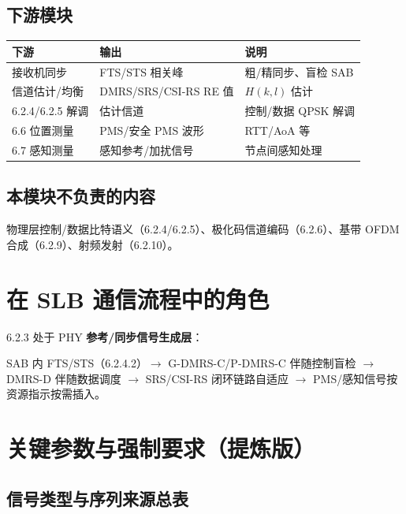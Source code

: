 \documentclass[11pt,a4paper]{ctexart}
\begin{document}
\subsection{下游模块}

\begin{table}[h]
\centering
\small
\begin{tabular}{L{4cm}L{4.5cm}L{5.5cm}}
\toprule
\textbf{下游} & \textbf{输出} & \textbf{说明} \\
\midrule
接收机同步 & FTS/STS 相关峰 & 粗/精同步、盲检 SAB \\
信道估计/均衡 & DMRS/SRS/CSI-RS RE 值 & $H(k,l)$ 估计 \\
6.2.4/6.2.5 解调 & 估计信道 & 控制/数据 QPSK 解调 \\
6.6 位置测量 & PMS/安全 PMS 波形 & RTT/AoA 等 \\
6.7 感知测量 & 感知参考/加扰信号 & 节点间感知处理 \\
\bottomrule
\end{tabular}
\end{table}

\subsection{本模块不负责的内容}

物理层控制/数据比特语义（6.2.4/6.2.5）、极化码信道编码（6.2.6）、基带 OFDM 合成（6.2.9）、射频发射（6.2.10）。

\section{在 SLB 通信流程中的角色}

6.2.3 处于 PHY \textbf{参考/同步信号生成层}：

SAB 内 FTS/STS（6.2.4.2）$\rightarrow$ G-DMRS-C/P-DMRS-C 伴随控制盲检 $\rightarrow$ DMRS-D 伴随数据调度 $\rightarrow$ SRS/CSI-RS 闭环链路自适应 $\rightarrow$ PMS/感知信号按资源指示按需插入。

\section{关键参数与强制要求（提炼版）}

\subsection{信号类型与序列来源总表}
\end{document}

